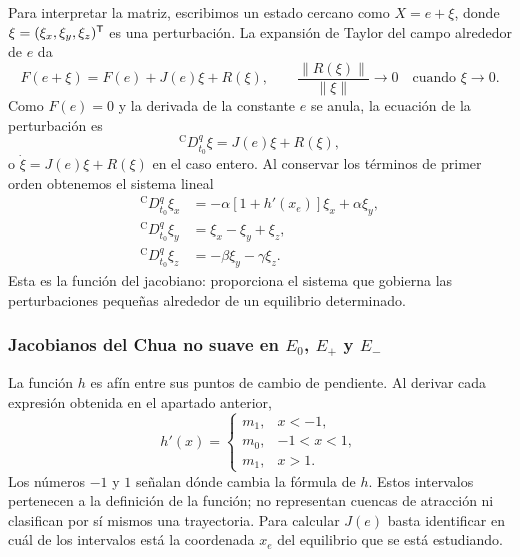 Para interpretar la matriz, escribimos un estado cercano como
\(X=e+\xi\), donde \(\xi=(\xi_x,\xi_y,\xi_z)^{\mathsf T}\) es una perturbación.
La expansión de Taylor del campo alrededor de \(e\) da
\[
F(e+\xi)=F(e)+J(e)\xi+R(\xi),
\qquad \frac{\lVert R(\xi)\rVert}{\lVert\xi\rVert}\longrightarrow0
\quad\text{cuando }\xi\longrightarrow0.
\]
Como \(F(e)=0\) y la derivada de la constante \(e\) se anula, la ecuación de
la perturbación es
\[
{}^{\mathrm C}D_{t_0}^{q}\xi=J(e)\xi+R(\xi),
\]
o \(\dot\xi=J(e)\xi+R(\xi)\) en el caso entero. Al conservar los términos
de primer orden obtenemos el sistema lineal
\[
\begin{aligned}
{}^{\mathrm C}D_{t_0}^{q}\xi_x
 &=-\alpha[1+h'(x_e)]\xi_x+\alpha\xi_y,\\
{}^{\mathrm C}D_{t_0}^{q}\xi_y
 &=\xi_x-\xi_y+\xi_z,\\
{}^{\mathrm C}D_{t_0}^{q}\xi_z
 &=-\beta\xi_y-\gamma\xi_z.
\end{aligned}
\]
Esta es la función del jacobiano: proporciona el sistema que gobierna las
perturbaciones pequeñas alrededor de un equilibrio determinado.

\subsubsection{Jacobianos del Chua no suave en \(E_0\), \(E_+\) y \(E_-\)}

La función \(h\) es afín entre sus puntos de cambio de pendiente. Al
derivar cada expresión obtenida en el apartado anterior,
\[
h'(x)=
\begin{cases}
m_1,&x<-1,\\
m_0,&-1<x<1,\\
m_1,&x>1.
\end{cases}
\]
Los números \(-1\) y \(1\) señalan dónde cambia la fórmula de \(h\).
Estos intervalos pertenecen a la definición de la función; no representan
cuencas de atracción ni clasifican por sí mismos una trayectoria.
Para calcular \(J(e)\) basta identificar en cuál de los intervalos está
la coordenada \(x_e\) del equilibrio que se está estudiando.

